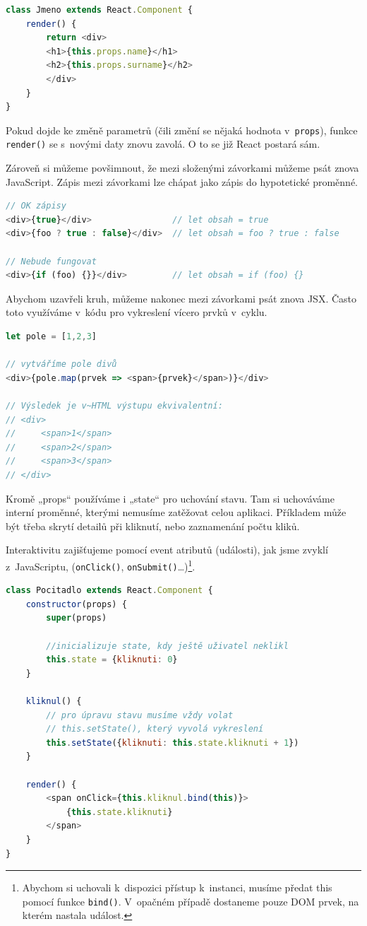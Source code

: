 \documentclass[a4paper,11pt,oneside]{article}
\begin{document}
\pagebreak

\begin{lstlisting}[language=javascript, caption={JavaScript}]
class Jmeno extends React.Component {
	render() {
		return <div>
		<h1>{this.props.name}</h1>
		<h2>{this.props.surname}</h2>
		</div>
	}
}
\end{lstlisting}

Pokud dojde ke změně parametrů (čili změní se nějaká hodnota v~\lstinline|props|), funkce \lstinline|render()| se s~novými daty znovu zavolá. O to se již React postará sám.  

Zároveň si můžeme povšimnout, že mezi složenými závorkami můžeme psát znova JavaScript. Zápis mezi závorkami lze chápat jako zápis do hypotetické proměnné.

\begin{lstlisting}[language=javascript, caption={JavaScript}]
// OK zápisy
<div>{true}</div>                // let obsah = true 
<div>{foo ? true : false}</div>  // let obsah = foo ? true : false

// Nebude fungovat
<div>{if (foo) {}}</div>         // let obsah = if (foo) {}
\end{lstlisting}

Abychom uzavřeli kruh, můžeme nakonec mezi závorkami psát znova JSX. Často toto využíváme v~kódu pro vykreslení vícero prvků v~cyklu.

\begin{lstlisting}[language=javascript, caption={JavaScript}]
let pole = [1,2,3]

// vytváříme pole divů
<div>{pole.map(prvek => <span>{prvek}</span>)}</div>  

// Výsledek je v~HTML výstupu ekvivalentní:
// <div>
//     <span>1</span>
//     <span>2</span>
//     <span>3</span>
// </div>
\end{lstlisting}

Kromě „props“ používáme i „state“ pro uchování stavu. Tam si uchováváme interní proměnné, kterými nemusíme zatěžovat celou aplikaci. Příkladem může být třeba skrytí detailů při kliknutí, nebo zaznamenání počtu kliků. 

Interaktivitu zajišťujeme pomocí event atributů (události), jak jsme zvyklí z~JavaScriptu, (\lstinline|onClick()|, \lstinline|onSubmit()|…)\footnote{Abychom si uchovali k~dispozici přístup k~instanci, musíme předat this pomocí funkce \lstinline|bind()|. V~opačném případě dostaneme pouze DOM prvek, na kterém nastala událost.}. 

\begin{lstlisting}[language=javascript, caption={JavaScript}]
class Pocitadlo extends React.Component {
	constructor(props) {
		super(props)
		
		//inicializuje state, kdy ještě uživatel neklikl
		this.state = {kliknuti: 0}                                
	}
	
	kliknul() {
		// pro úpravu stavu musíme vždy volat 
		// this.setState(), který vyvolá vykreslení
		this.setState({kliknuti: this.state.kliknuti + 1})       
	}
	
	render() {
		<span onClick={this.kliknul.bind(this)}>
			{this.state.kliknuti}
		</span>
	}
}
\end{lstlisting}
\vspace*{\fill}
\pagebreak
\end{document}
